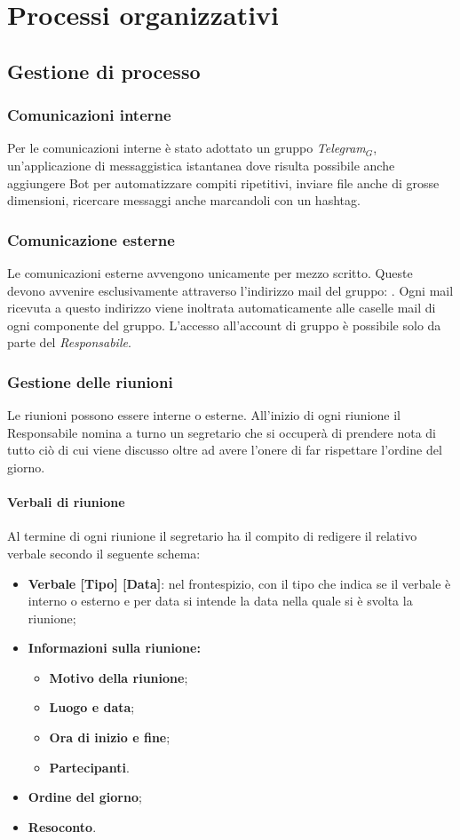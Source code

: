 \chapter{Processi organizzativi}
\section{Gestione di processo}
\subsection{Comunicazioni interne}
Per le comunicazioni interne è stato adottato un gruppo \textit{Telegram$_{G}$}, un'applicazione di messaggistica istantanea dove risulta possibile anche aggiungere Bot per automatizzare compiti ripetitivi, inviare file anche di grosse dimensioni, ricercare messaggi anche marcandoli con un hashtag.
\subsection{Comunicazione esterne}
Le comunicazioni esterne avvengono unicamente per mezzo scritto. 
Queste devono avvenire esclusivamente attraverso l'indirizzo mail del gruppo: \mailzeroseven.
Ogni mail ricevuta a questo indirizzo viene inoltrata automaticamente alle caselle mail di ogni componente del gruppo. L'accesso all'account di gruppo è possibile solo da parte del \textit{Responsabile}.
\subsection{Gestione delle riunioni}
Le riunioni possono essere interne o esterne. 
All'inizio di ogni riunione il Responsabile nomina a turno un segretario che si occuperà di prendere nota di tutto ciò di cui viene discusso oltre ad avere l'onere di far rispettare l'ordine del giorno.
\subsubsection{Verbali di riunione}
Al termine di ogni riunione il segretario ha il compito di redigere il relativo verbale secondo il seguente schema:
\begin{itemize}
	\item \textbf{Verbale [Tipo] [Data]}: nel frontespizio, con il tipo che indica se il verbale è interno o esterno e per data si intende la data nella quale si è svolta la riunione;
	\item \textbf{Informazioni sulla riunione:}
	\begin{itemize}
			\item \textbf{Motivo della riunione};
			\item \textbf{Luogo e data};
			\item \textbf{Ora di inizio e fine};
			\item \textbf{Partecipanti}.
	\end{itemize}
	\item \textbf{Ordine del giorno};
	\item \textbf{Resoconto}.
\end{itemize}
